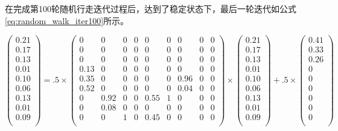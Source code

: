 在完成第100轮随机行走迭代过程后，达到了稳定状态下，最后一轮迭代如公式\ref{eq:random_walk_iter100}所示。

\begin{equation}\label{eq:random_walk_iter100}
\left(
\begin{matrix}
0.21\\
0.17\\
0.13\\
0.01\\
0.10\\
0.06\\
0.13\\
0.01\\
0.09\\
\end{matrix}
\right)
=.5\times
\left(
\begin{matrix}
0 & 0 & 0 & 0 & 0 & 0 & 0 & 0 & 0\\
0 & 0 & 0 & 0 & 0 & 0 & 0 & 0 & 0\\
0 & 0 & 0 & 0 & 0 & 0 & 0 & 0 & 0\\
0.13 & 0 & 0 & 0 & 0 & 0 & 0 & 0 & 0\\
0.35 & 0 & 0 & 0 & 0 & 0 & 0.96 & 0 & 0\\
0.52 & 0 & 0 & 0 & 0 & 0 & 0.04 & 0 & 0\\
0 & 0.92 & 0 & 0 & 0.55 & 1 & 0 & 0 & 0\\
0 & 0.08 & 0 & 0 & 0 & 0 & 0 & 0 & 0\\
0 & 0 & 1 & 0 & 0.45 & 0 & 0 & 0 & 0\\
\end{matrix}
\right)\times
\left(
\begin{matrix}
0.21\\
0.17\\
0.13\\
0.01\\
0.10\\
0.06\\
0.13\\
0.01\\
0.09\\
\end{matrix}
\right)+
.5\times
\left(
\begin{matrix}
0.41\\
0.33\\
0.26\\
0\\
0\\
0\\
0\\
0\\
0\\
\end{matrix}
\right)
\end{equation}

